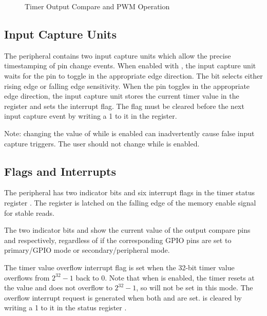 \begin{figure}[htpb]
	
	\caption{Timer Output Compare and PWM Operation}
	\label{fig:timer-output-compare-operation}
\end{figure}



\subsection{Input Capture Units}

The  peripheral contains two input capture units which allow the precise timestamping of pin change events. When enabled with , the input capture unit waits for the  pin to toggle in the appropriate edge direction. The  bit selects either rising edge or falling edge sensitivity. When the pin toggles in the appropriate edge direction, the input capture unit stores the current timer value in the  register and sets the  interrupt flag. The  flag must be cleared before the next input capture event by writing a 1 to it in the  register.

Note: changing the value of  while  is enabled can inadvertently cause false input capture triggers. The user should not change  while  is enabled.



\subsection{Flags and Interrupts}

The  peripheral has two indicator bits and six interrupt flags in the timer status register . The  register is latched on the falling edge of the memory enable signal for stable reads.

The two indicator bits  and  show the current value of the output compare pins  and  respectively, regardless of if the corresponding GPIO pins are set to primary/GPIO mode or secondary/peripheral mode.

The timer value overflow interrupt flag  is set when the 32-bit timer value overflows from $2^{32} - 1$ back to 0. Note that when  is enabled, the timer resets at the  value and does not overflow to $2^{32} - 1$, so  will not be set in this mode. The overflow interrupt request is generated when both  and  are set.  is cleared by writing a 1 to it in the status register .

